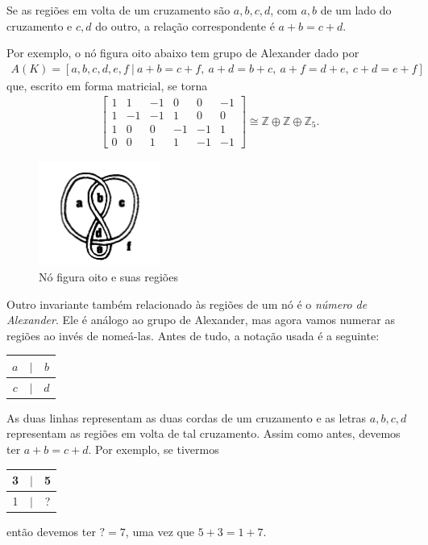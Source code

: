 	\par\vspace{0.3cm} Se as regiões em volta de um cruzamento são $a,b,c,d$, com $a,b$ de um 
	lado do cruzamento e $c,d$ do outro, a relação correspondente é $a+b=c+d$.
	\begin{example}
    	Por exemplo, o nó figura oito abaixo tem grupo de Alexander dado por 
    	\begin{align*}
    	    A(K) = [a,b,c,d,e,f \ \vert \ a+b=c+f,\ a+d=b+c,\ a+f=d+e,\ c+d=e+f] 
    	\end{align*}
    	que, escrito em forma matricial, se torna
    	\begin{align*}
        	\begin{bmatrix}
        	1 & 1 & -1 & 0 & 0 & -1 \\
        	1 & -1 & -1 & 1 & 0 & 0 \\
        	1 & 0 & 0 & -1 & -1 & 1 \\
        	0 & 0 & 1 & 1 & -1 & -1 
        	\end{bmatrix}\cong\mathbb{Z}\oplus\mathbb{Z}\oplus\mathbb{Z}_5.
    	\end{align*}
    	\begin{figure}[H]
    	\label{exemplo grupo Alexander}
    		\begin{center}
    			\includegraphics[width=4cm]{Images/exemplo_grupo_alexander.png}
    		\end{center}\caption{Nó figura oito e suas regiões}
    	\end{figure}
	\end{example}
	Outro invariante também relacionado às regiões de um nó é o \textit{número de Alexander}. 
	Ele é análogo ao grupo de Alexander, mas agora vamos numerar as regiões ao invés de nomeá-las. 
	Antes de tudo, a notação usada é a seguinte:
	\begin{center}
		\begin{tabular}{ccc}
			$a$ & $\vert$ & $b$ \\
			\hline 
			$c$ & $\vert$ & $d$
		\end{tabular}
	\end{center}
	As duas linhas representam as duas cordas de um cruzamento e as letras $a,b,c,d$ representam 
	as regiões em volta de tal cruzamento. Assim como antes, devemos ter $a+b=c+d$. 
	Por exemplo, se tivermos
	\begin{center}
		\begin{tabular}{ccc}
			3 & $\vert$ & 5 \\
			\hline 
			1 & $\vert$ & ?
		\end{tabular}
	\end{center}
	então devemos ter $?=7$, uma vez que $5+3=1+7$.
	

